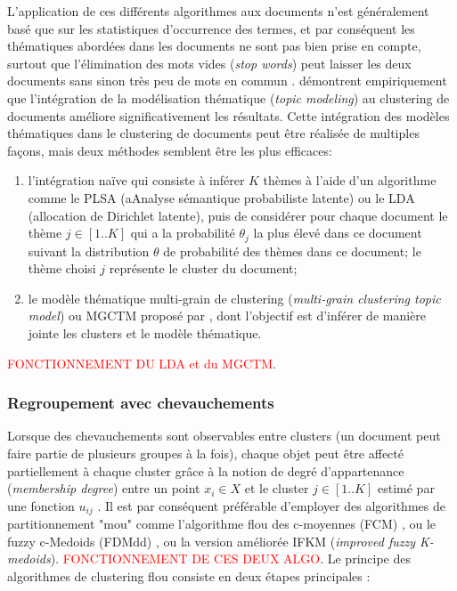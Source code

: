 L'application de ces différents algorithmes aux documents n'est généralement basé que sur les statistiques d'occurrence des termes, et par conséquent les thématiques abordées dans les documents ne sont pas bien prise en compte, surtout que l'élimination des \og mots vides \fg{} (\textit{stop words}) peut laisser les deux documents sans sinon très peu de mots en commun \cite{kusner2015wordmoverdist}. \citet{xie2013MGCTM} démontrent empiriquement que l'intégration de la  modélisation thématique (\textit{topic modeling}) au clustering de documents améliore significativement les résultats. Cette intégration des modèles thématiques dans le clustering de documents peut être réalisée de multiples façons, mais deux méthodes semblent être les plus efficaces:
\begin{enumerate}
	\item l'intégration naïve \citep{lu2011kmeansLDApLSA} qui consiste à inférer $K$ thèmes à l'aide d'un algorithme comme le PLSA (aAnalyse sémantique probabiliste latente) \citep{hofmann1999PLSA} ou le LDA (allocation de Dirichlet latente)\citep{blei2003lda}, puis de considérer pour chaque document le thème $j \in [1..K]$ qui a la probabilité $\theta_j$ la plus élevé dans ce document suivant la distribution $\theta$ de probabilité des thèmes dans ce document; le thème choisi $j$ représente le cluster du document;
	\item le modèle thématique multi-grain de clustering (\textit{multi-grain clustering topic model}) ou MGCTM proposé par \citet{xie2013MGCTM}, dont l'objectif est d'inférer de manière jointe les clusters et le modèle thématique.
\end{enumerate}

\textcolor{red}{FONCTIONNEMENT DU LDA et du MGCTM}.

\subsubsection{Regroupement avec chevauchements}

Lorsque des chevauchements sont observables entre clusters (un document peut faire partie de plusieurs groupes à la fois), chaque objet peut être affecté partiellement à chaque cluster grâce à la notion de degré d'appartenance (\textit{membership degree}) entre un point $x_i \in X$ et le cluster $j \in [1..K]$ estimé par une fonction $u_{ij}$  \citep{baraldi1999surveyfuzzyclstering}. Il est par conséquent préférable d'employer des algorithmes de partitionnement "mou" comme l'algorithme flou des c-moyennes (FCM) \citep{bezdek1984fcm, hathaway1989fuzzycmeans}, ou le fuzzy c-Medoids (FDMdd) \citep{krishnapuram2001fuzzycmedoids}, ou la version améliorée IFKM (\textit{improved fuzzy K-medoids})\citep{sabzi2011fuzzykmedoids}. \textcolor{red}{FONCTIONNEMENT DE CES DEUX ALGO}. Le principe des algorithmes de clustering flou consiste en deux étapes principales \citep{sabzi2011fuzzykmedoids}: 

